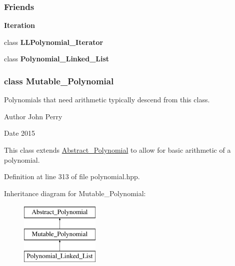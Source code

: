 \subsubsection*{Friends}
\begin{Indent}\textbf{ Iteration}\par
\begin{DoxyCompactItemize}
\item 
\mbox{\label{group__polygroup_adc04ceaa684cbc36bd6800c57364bd2e}} 
class {\bfseries L\+L\+Polynomial\+\_\+\+Iterator}
\item 
\mbox{\label{group__polygroup_a7e28ea806491074003c51b4d857abd6c}} 
class {\bfseries Polynomial\+\_\+\+Linked\+\_\+\+List}
\end{DoxyCompactItemize}
\end{Indent}
\label{class_mutable___polynomial}
\subsubsection{class Mutable\+\_\+\+Polynomial}
Polynomials that need arithmetic typically descend from this class. 

\begin{DoxyAuthor}{Author}
John Perry 
\end{DoxyAuthor}
\begin{DoxyDate}{Date}
2015
\end{DoxyDate}
This class extends \hyperlink{group__polygroup_class_abstract___polynomial}{Abstract\+\_\+\+Polynomial} to allow for basic arithmetic of a polynomial. 

Definition at line 313 of file polynomial.\+hpp.

Inheritance diagram for Mutable\+\_\+\+Polynomial\+:\begin{figure}[H]
\begin{center}
\leavevmode
\includegraphics[height=3.000000cm]{group__polygroup}
\end{center}
\end{figure}
